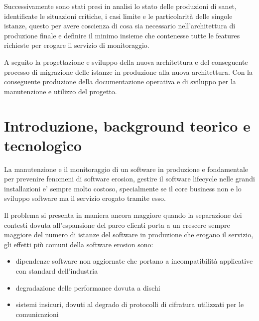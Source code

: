 \documentclass[12pt,a4paper,twoside,openright]{book}
\begin{document}
Successivamente sono stati presi in analisi lo stato delle produzioni di sanet, identificate le situazioni critiche, i casi limite e le particolarità delle singole istanze, questo per avere coscienza di cosa sia necessario nell'architettura di produzione finale e definire il minimo insieme che contenesse tutte le features richieste per erogare il servizio di monitoraggio.

A seguito la progettazione e sviluppo della nuova architettura e del conseguente processo di migrazione delle istanze in produzione alla nuova architettura. Con la conseguente produzione della documentazione operativa e di sviluppo per la manutenzione e utilizzo del progetto.

\newpage

\tableofcontents

\newpage

\listoffigures

\mainmatter

\pagestyle{fancy}
\fancyhead[LO]{\nouppercase{\rightmark}}
\fancyhead[RE]{\nouppercase{\leftmark}}
\fancyhead[LE,RO]{\thepage}
\fancyfoot{}

\chapter{Introduzione, background teorico e tecnologico}

La manutenzione e il monitoraggio di un software in produzione e fondamentale per prevenire fenomeni di software erosion, gestire il software lifecycle nelle grandi installazioni e' sempre molto costoso, specialmente se il core business non e lo sviluppo software ma il servizio erogato tramite esso.

Il problema si presenta in maniera ancora maggiore quando la separazione dei contesti dovuta all'espansione del parco clienti porta a un crescere sempre maggiore del numero di istanze del software in produzione che erogano il servizio, gli effetti più comuni della software erosion sono:

\begin{itemize}
    \item dipendenze software non aggiornate che portano a incompatibilità applicative con standard dell'industria
    \item degradazione delle performance dovuta a dischi 
    \item sistemi insicuri, dovuti al degrado di protocolli di cifratura utilizzati per le comunicazioni
\end{itemize}
\end{document}
